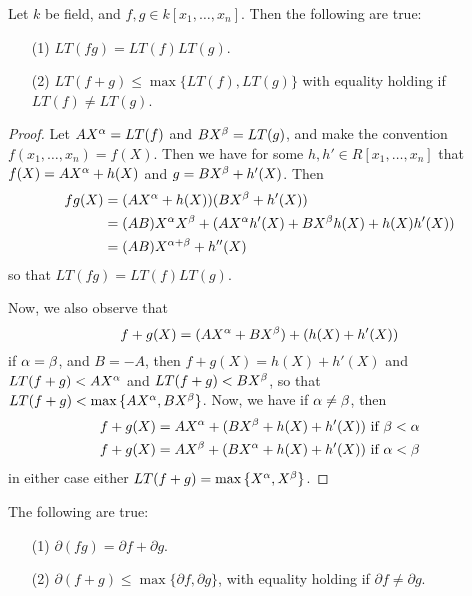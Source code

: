 \begin{lemma}\label{lemma_7.6.2}
  Let $k$ be field, and $f,g \in k[x_1, \dots, x_n]$. Then
  the following are true:
  \begin{enumerate}
    \item[(1)] $LT(fg)=LT(f)LT(g)$.

    \item[(2)] $LT(f+g) \leq \max{\{LT(f), LT(g)\}}$ with equality
      holding if $LT(f) \neq LT(g)$.
  \end{enumerate}
\end{lemma}
\begin{proof}
  Let $AX^\alpha=LT(f)$ and $BX^\beta=LT(g)$, and make the convention $f(x_1,
  \dots, x_n)=f(X)$. Then we have for some $h,h' \in R[x_1, \dots,
  x_n]$ that $f(X)=AX^\alpha+h(X)$ and $g=BX^\beta+h'(X)$. Then
  \begin{align*}
    fg(X) &=  (AX^\alpha+h(X))(BX^\beta+h'(X))  \\
          &= (AB)X^\alpha X^\beta+(AX^\alpha h'(X)+BX^\beta h(X)+h(X)h'(X))  \\
          &=  (AB)X^{\alpha+\beta}+h''(X)  \\
  \end{align*}
  so that $LT(fg)=LT(f)LT(g)$.

  Now, we also observe that
  \begin{equation*}
    f+g(X)=(AX^\alpha+BX^\beta)+(h(X)+h'(X))
  \end{equation*}
  if $\alpha=\beta$, and $B=-A$, then $f+g(X)=h(X)+h'(X)$ and $LT(f+g)<AX^\alpha$
  and $LT(f+g)<BX^\beta$, so that $LT(f+g)<\max{\{AX^\alpha,BX^\beta\}}$. Now, we have
  if  $\alpha \neq \beta$, then
  \begin{align*}
    f+g(X)=AX^\alpha+(BX^\beta+h(X)+h'(X))  & \text{ if } \beta < \alpha  \\
    f+g(X)=AX^\beta+(BX^\alpha+h(X)+h'(X))  & \text{ if } \alpha < \beta  \\
  \end{align*}
  in either case either $LT(f+g)=\max{\{X^\alpha,X^\beta\}}$.
\end{proof}
\begin{corollary}
  The following are true:
  \begin{enumerate}
    \item[(1)] $\partial{(fg)}=\partial{f}+\partial{g}$.

    \item[(2)] $\partial{(f+g)} \leq \max{\{\partial{f},
      \partial{g}\}}$, with equality holding if $\partial{f} \neq
      \partial{g}$.
  \end{enumerate}
\end{corollary}

